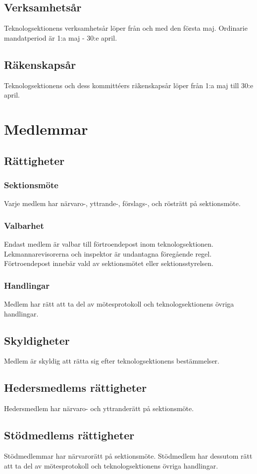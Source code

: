 \documentclass[a4paper]{dtek}
\begin{document}
\subsection{Verksamhetsår}
Teknologsektionens verksamhetsår löper från och med den första maj. Ordinarie mandatperiod är 1:a maj - 30:e april.
\subsection{Räkenskapsår}
Teknologsektionens och dess kommittéers räkenskapsår löper från 1:a maj till 30:e april.
\newpage

\section{Medlemmar}
\subsection{Rättigheter}
\subsubsection{Sektionsmöte}
Varje medlem har närvaro-, yttrande-, förslags-, och rösträtt på sektionsmöte.
\subsubsection{Valbarhet}
\label{sec:medlemmar_valbarhet}
Endast medlem är valbar till förtroendepost inom teknologsektionen. Lekmannarevisorerna och inspektor är undantagna föregående regel. Förtroendepost innebär vald av sektionsmötet eller sektionsstyrelsen.
\subsubsection{Handlingar}
Medlem har rätt att ta del av mötesprotokoll och teknologsektionens övriga handlingar.
\subsection{Skyldigheter}
Medlem är skyldig att rätta sig efter teknologsektionens bestämmelser.
\subsection{Hedersmedlems rättigheter}
Hedersmedlem har närvaro- och yttranderätt på sektionsmöte.
\subsection{Stödmedlems rättigheter}
Stödmedlemmar har närvarorätt på sektionsmöte. Stödmedlem har dessutom rätt att ta del av mötesprotokoll och teknologsektionens övriga handlingar.
\newpage
\end{document}
